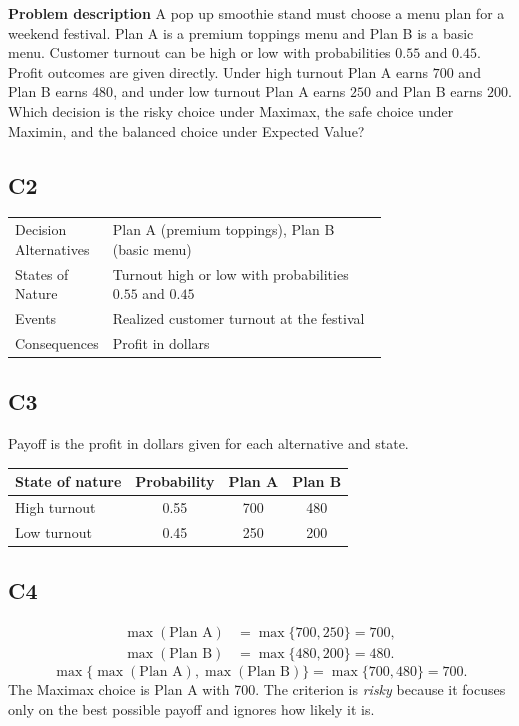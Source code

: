 	\begin{ExamProblems}
		\item
		\textbf{Problem description}
		A pop up smoothie stand must choose a menu plan for a weekend festival. Plan A is a premium toppings menu and Plan B is a basic menu. Customer turnout can be high or low with probabilities $0.55$ and $0.45$. Profit outcomes are given directly. Under high turnout Plan A earns $700$ and Plan B earns $480$, and under low turnout Plan A earns $250$ and Plan B earns $200$. Which decision is the risky choice under Maximax, the safe choice under Maximin, and the balanced choice under Expected Value?

		\subsection*{C2}
		\begin{center}
			\begin{tabular}{l p{0.74\linewidth}}
				\toprule
				Decision Alternatives & Plan A (premium toppings), Plan B (basic menu) \\
				States of Nature & Turnout high or low with probabilities $0.55$ and $0.45$ \\
				Events & Realized customer turnout at the festival \\
				Consequences & Profit in dollars \\
				\bottomrule
			\end{tabular}
		\end{center}

		\subsection*{C3}
		Payoff is the profit in dollars given for each alternative and state.
		\begin{center}
			\begin{tabular}{l c c c}
				\toprule
				State of nature & Probability & Plan A & Plan B \\
				\midrule
				High turnout & 0.55 & 700 & 480 \\
				Low turnout & 0.45 & 250 & 200 \\
				\bottomrule
		\end{tabular}
		\end{center}

		\subsection*{C4}
		\[
		\begin{aligned}
		\max(\text{Plan A}) &= \max\{700,250\} = 700,\\
		\max(\text{Plan B}) &= \max\{480,200\} = 480.
		\end{aligned}
		\]
		\[
		\max\{\max(\text{Plan A}), \max(\text{Plan B})\}
		= \max\{700, 480\}
		= 700.
		\]
		The Maximax choice is Plan A with 700. The criterion is \emph{risky} because it focuses only on the best possible payoff and ignores how likely it is.


\end{ExamProblems}
